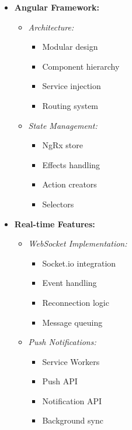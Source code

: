 \begin{itemize}
    \item \textbf{Angular Framework:}
    \begin{itemize}
        \item \textit{Architecture:}
        \begin{itemize}
            \item Modular design
            \item Component hierarchy
            \item Service injection
            \item Routing system
        \end{itemize}
        \item \textit{State Management:}
        \begin{itemize}
            \item NgRx store
            \item Effects handling
            \item Action creators
            \item Selectors
        \end{itemize}
    \end{itemize}
    
    \item \textbf{Real-time Features:}
    \begin{itemize}
        \item \textit{WebSocket Implementation:}
        \begin{itemize}
            \item Socket.io integration
            \item Event handling
            \item Reconnection logic
            \item Message queuing
        \end{itemize}
        \item \textit{Push Notifications:}
        \begin{itemize}
            \item Service Workers
            \item Push API
            \item Notification API
            \item Background sync
        \end{itemize}
    \end{itemize}
    

\end{itemize}
